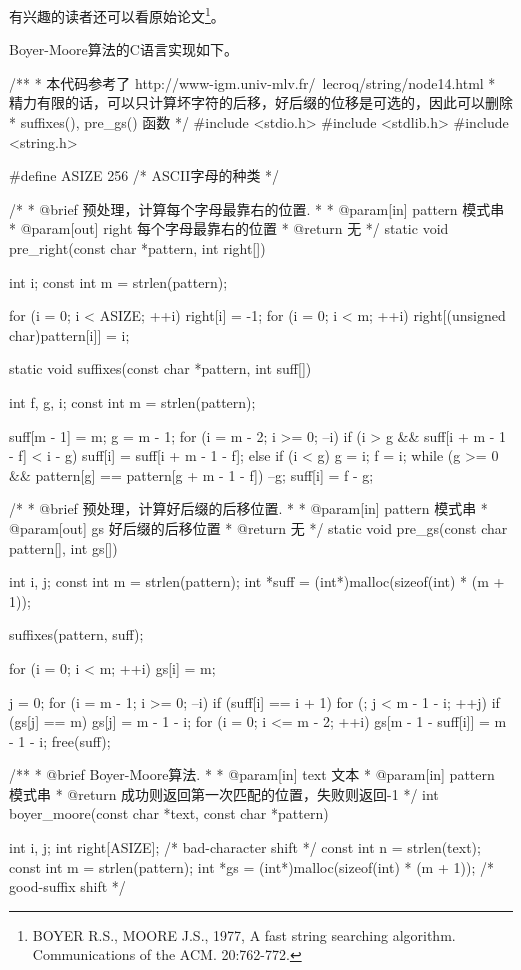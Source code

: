 有兴趣的读者还可以看原始论文\footnote{BOYER R.S., MOORE J.S., 1977, A fast string searching algorithm. Communications of the ACM. 20:762-772.}。

Boyer-Moore算法的C语言实现如下。
\begin{Codex}[label=boyer_moore.c]
/**
 * 本代码参考了 http://www-igm.univ-mlv.fr/~lecroq/string/node14.html
 * 精力有限的话，可以只计算坏字符的后移，好后缀的位移是可选的，因此可以删除
 * suffixes(), pre_gs() 函数
 */
#include <stdio.h>
#include <stdlib.h>
#include <string.h>

#define ASIZE 256  /* ASCII字母的种类 */

/*
 * @brief 预处理，计算每个字母最靠右的位置.
 *
 * @param[in] pattern 模式串
 * @param[out] right 每个字母最靠右的位置
 * @return 无
 */
static void pre_right(const char *pattern, int right[]) {
    int i;
    const int m = strlen(pattern);

    for (i = 0; i < ASIZE; ++i) right[i] = -1;
    for (i = 0; i < m; ++i) right[(unsigned char)pattern[i]] = i;
}


static void suffixes(const char *pattern, int suff[]) {
    int f, g, i;
    const int m = strlen(pattern);

    suff[m - 1] = m;
    g = m - 1;
    for (i = m - 2; i >= 0; --i) {
        if (i > g && suff[i + m - 1 - f] < i - g)
            suff[i] = suff[i + m - 1 - f];
        else {
            if (i < g)
                g = i;
            f = i;
            while (g >= 0 && pattern[g] == pattern[g + m - 1 - f])
                --g;
            suff[i] = f - g;
        }
    }
}

/*
 * @brief 预处理，计算好后缀的后移位置.
 *
 * @param[in] pattern 模式串
 * @param[out] gs 好后缀的后移位置
 * @return 无
 */
static void pre_gs(const char pattern[], int gs[]) {
    int i, j;
    const int m = strlen(pattern);
    int *suff = (int*)malloc(sizeof(int) * (m + 1));

    suffixes(pattern, suff);

    for (i = 0; i < m; ++i) gs[i] = m;

    j = 0;
    for (i = m - 1; i >= 0; --i) if (suff[i] == i + 1)
        for (; j < m - 1 - i; ++j) if (gs[j] == m)
            gs[j] = m - 1 - i;
    for (i = 0; i <= m - 2; ++i)
        gs[m - 1 - suff[i]] = m - 1 - i;
    free(suff);
}

/**
 * @brief Boyer-Moore算法.
 *
 * @param[in] text 文本
 * @param[in] pattern 模式串
 * @return 成功则返回第一次匹配的位置，失败则返回-1
 */
int boyer_moore(const char *text, const char *pattern) {
    int i, j;
    int right[ASIZE];  /* bad-character shift */
    const int n = strlen(text);
    const int m = strlen(pattern);
    int *gs = (int*)malloc(sizeof(int) * (m + 1));  /* good-suffix shift */

}
\end{Codex}
